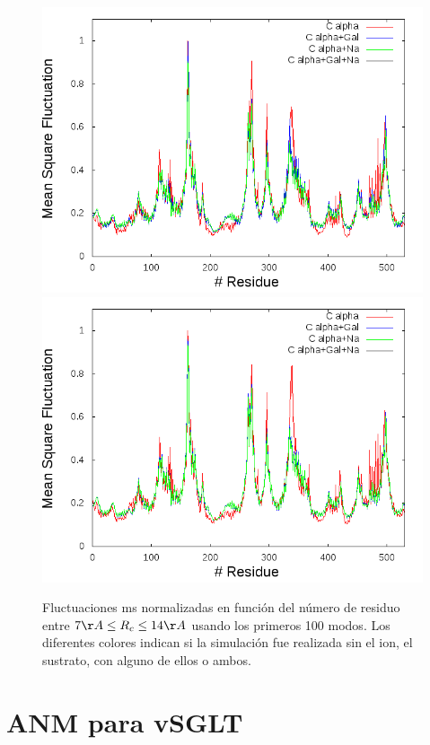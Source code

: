 \begin{figure}
      \includegraphics[scale=0.3]{./Kap4/ANM/ANM_server/grafica_13_A_n.png}
      \includegraphics[scale=0.3]{./Kap4/ANM/ANM_server/grafica_14_A_n.png}
 \caption{Fluctuaciones ms normalizadas en funci\'{o}n del n\'{u}mero de residuo entre $7\AA\leq R_c\leq 14\AA$ usando  los primeros 100 modos. Los diferentes colores indican si la simulaci\'{o}n fue realizada sin el ion, el sustrato, con alguno de ellos o ambos.}
\end{figure}
\section{ANM para vSGLT}
